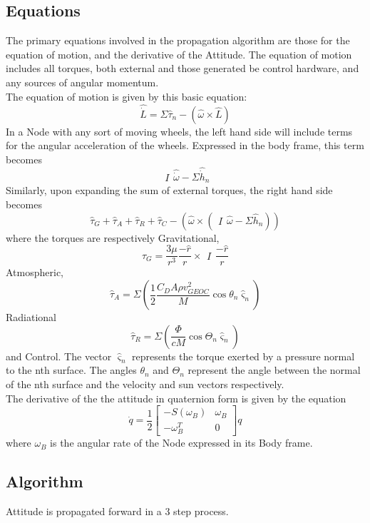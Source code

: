\documentclass[12pt,letterpaper]{paper}
\begin{document}
\subsection{Equations}
The primary equations involved in the propagation algorithm are those for the equation of motion, and the derivative of the Attitude. The equation of motion includes all torques, both external and those generated be control hardware, and any sources of angular momentum.
\\

The equation of motion is given by this basic equation:
\[\hat{\dot{L}}=\Sigma\hat{\tau}_{n} - (\hat{\omega} \times \hat{L})\]
In a Node with any sort of moving wheels, the left hand side will include terms for the angular acceleration of the wheels. Expressed in the body frame, this term becomes \[\begin{matrix}I\end{matrix} \hat{\dot{\omega}} - \Sigma\hat{\dot{h}}_{n}\] Similarly, upon expanding the sum of external torques, the right hand side becomes
\[\hat{\tau}_{G} + \hat{\tau}_{A} + \hat{\tau}_{R} + \hat{\tau}_{C} - (\hat{\omega} \times ( \begin{matrix}I\end{matrix} \hat{\omega} - \Sigma\hat{h}_{n}))\]
where the torques are respectively Gravitational,
\[\hat{\tau}_{G} = \dfrac{3\mu}{r^{3}}\dfrac{-\hat{r}}{r} \times \begin{matrix}I\end{matrix} \dfrac{-\hat{r}}{r}\]
Atmospheric,
\[\hat{\tau}_{A} = \Sigma\left(\dfrac{1}{2}\dfrac{C_{D}A\rho v_{GEOC}^{2}}{M}\cos \theta_{n}\hat{\varsigma}_{n}\right)\]
Radiational
\[\hat{\tau}_{R} = \Sigma\left(\dfrac{\Phi}{cM}\cos \Theta_{n}\hat{\varsigma}_{n}\right)\]
and Control. The vector $\hat{\varsigma}_{n}$ represents the torque exerted by a pressure normal to the nth surface. The angles $\theta_{n}$ and $\Theta_{n}$ represent the angle between the normal of the nth surface and the velocity and sun vectors respectively.
\\

The derivative of the the attitude in quaternion form is given by the equation
\[\dot{q} = \frac{1}{2}\left[\begin{matrix}
-S(\omega_{B})&\omega_{B}\\
-\omega_{B}^{T}&0
\end{matrix}\right]q\]
where $\omega_{B}$ is the angular rate of the Node expressed in its Body frame.
\subsection{Algorithm}
Attitude is propagated forward in a 3 step process.
\\
\end{document}
